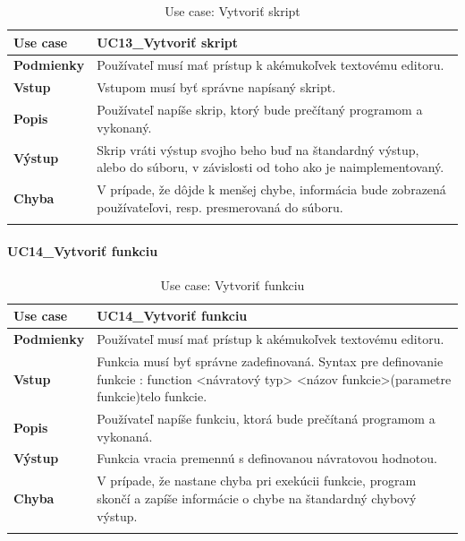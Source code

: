 {\begin{center}
\begin{longtable}{|p{2.5cm}|p{12.2cm}|}
			\hline
			\textbf{Use case} & UC13\_Vytvoriť skript \\ 
			\hline
			\textbf{Podmienky} & Používateľ musí mať prístup k akémukoľvek textovému editoru.  \\ 
			\hline
			\textbf{Vstup} & Vstupom musí byť správne napísaný skript. \\
			\hline
			\textbf{Popis} & Používateľ napíše skrip, ktorý bude prečítaný programom a vykonaný.\\ 
			\hline
			\textbf{Výstup} & Skrip vráti výstup svojho beho buď na štandardný výstup, alebo do súboru, v závislosti od toho ako je naimplementovaný.\\
			\hline
			\textbf{Chyba} & V prípade, že dôjde k menšej chybe, informácia bude zobrazená používateľovi, resp. presmerovaná do súboru.\\
			\hline
		\caption{Use case: Vytvoriť skript}
		\label{table:1}
		
	\end{longtable}
\end{center}
\paragraph{UC14\_Vytvoriť funkciu}
\begin{center}
	\begin{longtable}{|p{2.5cm}|p{12.2cm}|}
		
			\hline
			\textbf{Use case} & UC14\_Vytvoriť funkciu \\ 
			\hline
			\textbf{Podmienky} & Používateľ musí mať prístup k akémukoľvek textovému editoru.  \\ 
			\hline
			\textbf{Vstup} & Funkcia musí byť správne zadefinovaná. 
			Syntax pre definovanie funkcie : 
			\newline
			function <návratový typ> <názov funkcie>(parametre funkcie){telo funkcie}. \\
			\hline
			
			\textbf{Popis} & Používateľ napíše funkciu, ktorá bude prečítaná programom a vykonaná.\\ 
			\hline

			\textbf{Výstup} & Funkcia vracia premennú s definovanou návratovou hodnotou.\\
			\hline
			\textbf{Chyba} & V prípade, že nastane chyba pri exekúcii funkcie, program skončí a zapíše informácie o chybe na štandardný chybový výstup.\\
			\hline
		\caption{Use case: Vytvoriť funkciu}
		\label{table:1}
		

\end{longtable}
\end{center}}
